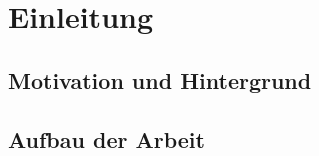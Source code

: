 \chapter{Einleitung}
\label{cha:einleitung}

\section{Motivation und Hintergrund}
\label{sec:motivation_und_hintergrund}

\section{Aufbau der Arbeit}
\label{sec:aufbau}
